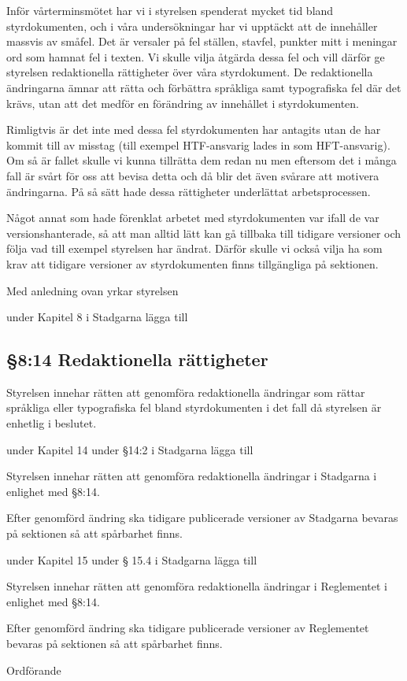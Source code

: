 \documentclass[../_main/handlingar.tex]{subfiles}
\begin{document}

Inför vårterminsmötet har vi i styrelsen spenderat mycket tid bland styrdokumenten, och i våra undersökningar har vi upptäckt att de innehåller massvis av småfel. Det är versaler på fel ställen, stavfel, punkter mitt i meningar ord som hamnat fel i texten. Vi skulle vilja åtgärda dessa fel och vill därför ge styrelsen redaktionella rättigheter över våra styrdokument. De redaktionella ändringarna ämnar att rätta och förbättra språkliga samt typografiska fel där det krävs, utan att det medför en förändring av innehållet i styrdokumenten.

Rimligtvis är det inte med dessa fel styrdokumenten har antagits utan de har kommit till av misstag (till exempel HTF-ansvarig lades in som HFT-ansvarig). Om så är fallet skulle vi kunna tillrätta dem redan nu men eftersom det i många fall är svårt för oss att bevisa detta och då blir det även svårare att motivera ändringarna. På så sätt hade dessa rättigheter underlättat arbetsprocessen.
 
Något annat som hade förenklat arbetet med styrdokumenten var ifall de var versionshanterade, så att man alltid lätt kan gå tillbaka till tidigare versioner och följa vad till exempel styrelsen har ändrat. Därför skulle vi också vilja ha som krav att tidigare versioner av styrdokumenten finns tillgängliga på sektionen.

Med anledning ovan yrkar styrelsen
\begin{attsatser}
    \att under Kapitel 8 i Stadgarna lägga till

    \subsection*{§8:14 Redaktionella rättigheter}
    
    Styrelsen innehar rätten att genomföra redaktionella ändringar som rättar språkliga eller typografiska fel bland styrdokumenten i det fall då styrelsen är enhetlig i beslutet. 
 
    \att under  Kapitel 14 under §14:2 i Stadgarna lägga till 
    
    Styrelsen innehar rätten att genomföra redaktionella ändringar i Stadgarna i enlighet med §8:14.
    
    Efter genomförd ändring ska tidigare publicerade versioner av Stadgarna bevaras på sektionen så att spårbarhet finns.


    \att under  Kapitel 15 under § 15.4 i Stadgarna lägga till 
    
    Styrelsen innehar rätten att genomföra redaktionella ändringar i Reglementet i enlighet med §8:14.
    
    Efter genomförd ändring ska tidigare publicerade versioner av Reglementet bevaras på sektionen så att spårbarhet finns.
 

\end{attsatser}

\begin{signatures}{1}
    \ist
    \signature{\ordf}{Ordförande}
\end{signatures}
\end{document}
